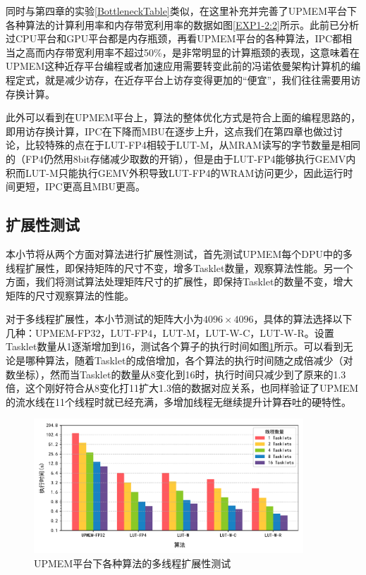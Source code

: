 同时与第四章的实验\ref{BottleneckTable}类似，在这里补充并完善了UPMEM平台下各种算法的计算利用率和内存带宽利用率的数据如图\ref{EXP1-2:2}所示。此前已分析过CPU平台和GPU平台都是内存瓶颈，再看UPMEM平台的各种算法，IPC都相当之高而内存带宽利用率不超过50\%，是非常明显的计算瓶颈的表现，这意味着在UPMEM这种近存平台编程或者加速应用需要转变此前的冯诺依曼架构计算机的编程定式，就是减少访存，在近存平台上访存变得更加的“便宜”，我们往往需要用访存换计算。

此外可以看到在UPMEM平台上，算法的整体优化方式是符合上面的编程思路的，即用访存换计算，IPC在下降而MBU在逐步上升，这点我们在第四章也做过讨论，比较特殊的点在于LUT-FP4相较于LUT-M，从MRAM读写的字节数量是相同的（FP4仍然用8bit存储减少取数的开销），但是由于LUT-FP4能够执行GEMV内积而LUT-M只能执行GEMV外积导致LUT-FP4的WRAM访问更少，因此运行时间更短，IPC更高且MBU更高。

\subsection{扩展性测试}
本小节将从两个方面对算法进行扩展性测试，首先测试UPMEM每个DPU中的多线程扩展性，即保持矩阵的尺寸不变，增多Tasklet数量，观察算法性能。另一个方面，我们将测试算法处理矩阵尺寸的扩展性，即保持Tasklet的数量不变，增大矩阵的尺寸观察算法的性能。

对于多线程扩展性，本小节测试的矩阵大小为$4096\times 4096$，具体的算法选择以下几种：UPMEM-FP32，LUT-FP4，LUT-M，LUT-W-C，LUT-W-R。设置Tasklet数量从1逐渐增加到16，测试各个算子的执行时间如图\ref{EXP3-1}所示。可以看到无论是哪种算法，随着Tasklet的成倍增加，各个算法的执行时间随之成倍减少（对数坐标），然而当Tasklet的数量从8变化到16时，执行时间只减少到了原来的1.3倍，这个刚好符合从8变化打11扩大1.3倍的数据对应关系，也同样验证了UPMEM的流水线在11个线程时就已经充满，多增加线程无继续提升计算吞吐的硬特性。

\begin{figure}[htbp]
    \centering
    \includegraphics[width=0.9\textwidth]{figures/Exp3-1.pdf}
    \caption{UPMEM平台下各种算法的多线程扩展性测试}
	\label{EXP3-1} %
\end{figure}

